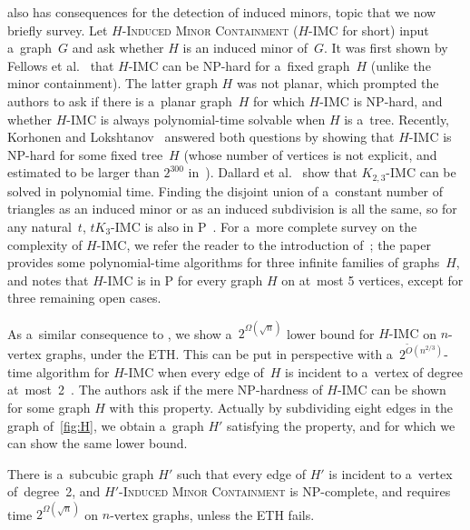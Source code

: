 \documentclass[a4paper,UKenglish,cleveref,autoref]{lipics-v2021}
\begin{document}
 also has consequences for the detection of induced minors, topic that we now briefly survey.  
Let \textsc{$H$-Induced Minor Containment} (\textsc{$H$-IMC} for short) input a~graph~$G$ and ask whether $H$ is an induced minor of~$G$.
It was first shown by Fellows et al.~\cite{Fellows95} that \textsc{$H$-IMC} can be NP-hard for a~fixed graph~$H$ (unlike the minor containment).
The latter graph $H$ was not planar, which prompted the authors to ask if there is a~planar graph~$H$ for which \textsc{$H$-IMC} is NP-hard, and whether \textsc{$H$-IMC} is always polynomial-time solvable when $H$ is a~tree.
Recently, Korhonen and Lokshtanov~\cite{KorhonenL23} answered both questions by showing that \textsc{$H$-IMC} is NP-hard for some fixed tree~$H$ (whose number of vertices is not explicit, and estimated to be larger than $2^{300}$ in~\cite{Dallard25}).
Dallard et al.~\cite{Dallard24} show that \textsc{$K_{2,3}$-IMC} can be solved in polynomial time.
Finding the disjoint union of a~constant number of triangles as an induced minor or as an induced subdivision is all the same, so for any natural~$t$, \textsc{$tK_3$-IMC} is also in P~\cite{DBLP:journals/jctb/NguyenSS24}.
For a~more complete survey on the complexity of \textsc{$H$-IMC}, we refer the reader to the introduction of~\cite{Dallard25}; the paper provides some polynomial-time algorithms for three infinite families of graphs~$H$, and notes that \textsc{$H$-IMC} is in P for every graph $H$ on at~most 5 vertices, except for three remaining open cases.

As a~similar consequence to , we show a~$2^{\Omega(\sqrt{n})}$ lower bound for \textsc{$H$-IMC} on $n$-vertex graphs, under the ETH.
This can be put in perspective with a~$2^{\tilde{O}(n^{2/3})}$-time algorithm for \textsc{$H$-IMC} when every edge of~$H$ is incident to a~vertex of degree at~most~2~\cite{KorhonenL23}.
The authors ask if the mere NP-hardness of \textsc{$H$-IMC} can be shown for some graph $H$ with this property. 
Actually by subdividing eight edges in the graph of~\cref{fig:H}, we obtain a~graph $H'$ satisfying the property, and for which we can show the same lower bound.

\begin{theorem}\label{thm:hardness-subcubic-ind-minor}
  There is a~subcubic graph $H'$ such that every edge of $H'$ is incident to a~vertex of~degree~2, and \textsc{$H'$-Induced Minor Containment} is NP-complete, and requires time $2^{\Omega(\sqrt n)}$ on $n$-vertex graphs, unless the ETH fails.
\end{theorem}
\end{document}
